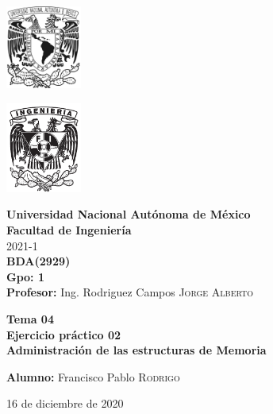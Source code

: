 \documentclass{article}
\newcommand{\materia}{BDA}
\newcommand{\clave}{2929}
\newcommand{\profesor}{Ing. Rodriguez Campos \textsc{Jorge Alberto}}
\newcommand{\semestre}{2021-1}
\newcommand{\alumno}{Francisco Pablo \textsc{Rodrigo}}
\newcommand{\actividad}{Tema 04 \\ Ejercicio práctico 02}
\newcommand{\titulo}{Administración de las estructuras de Memoria}
\newcommand{\fechaEntrega}{16 de diciembre de 2020}
\begin{document}
\thispagestyle{empty}
\begin{minipage}[t][5cm][t]{0.2\linewidth}
    \includegraphics[width=2.5cm]{unam.jpg}
    \vspace{10cm}

    \includegraphics[width=2.5cm]{fiblack}
\end{minipage}
\begin{minipage}[t]{0.7\linewidth}
    \vspace{-2.5cm}
    \LARGE{\textbf{Universidad Nacional Autónoma de México}}\\
    \Large{\textbf{Facultad de Ingeniería}} \\

    \large{\semestre}\\[2cm]

    \large{\textbf{\materia (\clave)}}\\
    \large{\textbf{Gpo: 1}}\\[5mm]
    \large{\textbf{Profesor:} \profesor}\\ [1.5cm]
    \begin{center}
        \LARGE{\textbf{\actividad}}\\
        \LARGE{\textbf{\titulo}}\\
    \end{center}

    \vspace{3.3cm}

    \large{\textbf{Alumno:} \alumno} \\[1.5cm]

    \begin{flushright}
        \fechaEntrega%
    \end{flushright}
\end{minipage}

\newpage
\end{document}
